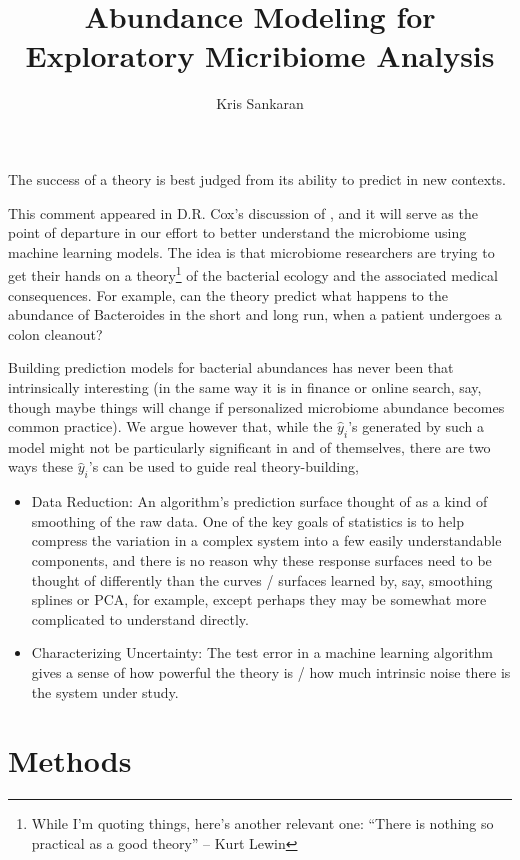 \documentclass{article}
\title{Abundance Modeling for Exploratory Micribiome Analysis}
\author{Kris Sankaran}
\begin{document}
\maketitle

\begin{displayquote}
The success of a theory is best judged from its ability to predict
  in new contexts.
\end{displayquote}

This comment appeared in D.R. Cox's discussion of \cite{breiman2001statistical},
and it will serve as the point of departure in our effort to better understand
the microbiome using machine learning models. The idea is that microbiome
researchers are trying to get their hands on a theory\footnote{While I'm quoting
  things, here's another relevant one: ``There is nothing so practical as a good
  theory'' -- Kurt Lewin} of the bacterial ecology and the associated medical
consequences. For example, can the theory predict what happens to the abundance
of Bacteroides in the short and long run, when a patient undergoes a colon
cleanout?

Building prediction models for bacterial abundances has never been that
intrinsically interesting (in the same way it is in finance or online search,
say, though maybe things will change if personalized microbiome abundance
becomes common practice). We argue however that, while the $\hat{y}_{i}$'s
generated by such a model might not be particularly significant in and of
themselves, there are two ways these $\hat{y}_{i}$'s can be used to guide real
theory-building,

\begin{itemize}
\item Data Reduction: An algorithm's prediction surface thought of as a kind of
  smoothing of the raw data. One of the key goals of statistics is to help
  compress the variation in a complex system into a few easily understandable
  components, and there is no reason why these response surfaces need to be
  thought of differently than the curves / surfaces learned by, say, smoothing
  splines or PCA, for example, except perhaps they may be somewhat more
  complicated to understand directly.
\item Characterizing Uncertainty: The test error in a machine learning algorithm
  gives a sense of how powerful the theory is / how much intrinsic noise there
  is the system under study.
\end{itemize}

\section{Methods}
\end{document}
